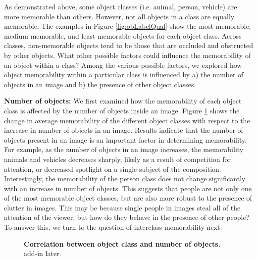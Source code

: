 As demonstrated above, some object classes (i.e. animal, person, vehicle) are more memorable than others. However, not all objects in a class are equally memorable. The examples in Figure \ref{fig:obLabelQual} show the most memorable, medium memorable, and least memorable objects for each object class. Across classes, non-memorable objects tend to be those that are occluded and obstructed by other objects. What other possible factors could influence the memorability of an object within a class? Among the various possible factors, we explored how object memorability within a particular class is influenced by a) the number of objects in an image and b) the presence of other object classes.

\textbf{Number of objects:} We first examined how the memorability of each object class is affected by the number of objects inside an image. Figure \ref{fig:obLabelChange} shows the change in average memorability of the different object classes with respect to the increase in number of objects in an image. Results indicate that the number of objects present in an image is an important factor in determining memorability. For example, as the number of objects in an image increases, the memorability  animals and vehicles decreases sharply, likely as a result of competition for attention, or decreased spotlight on a single subject of the composition.  Interestingly, the memorability of the person class does not change significantly with an increase in number of objects. This suggests that people are not only one of the most memorable object classes, but are also more robust to the presence of clutter in images. This may be because single people in images steal all of the attention of the viewer, but how do they behave in the presence of other people? To answer this, we turn to the question of interclass memorability next.

\begin{figure}[t]
\centering
{}
\vspace{-5mm}\caption{\footnotesize\textbf{Correlation between object class and number of objects.} add-in later. }\label{fig:obLabelChange}
\end{figure}

